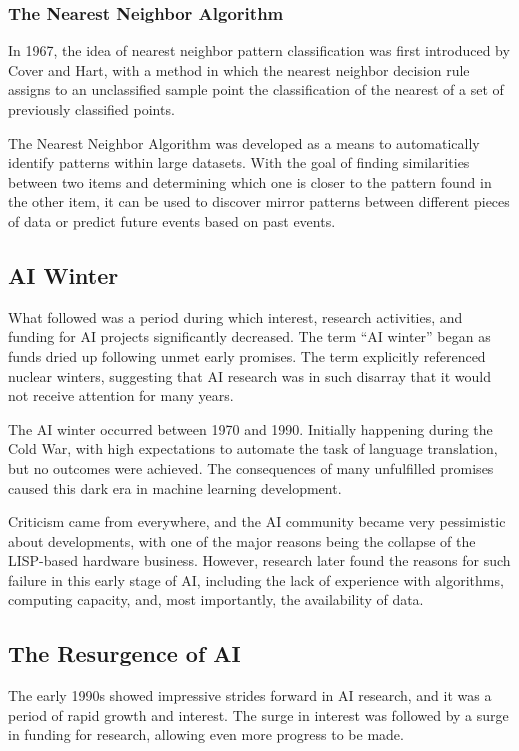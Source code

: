 \documentclass{article}
\begin{document}
\subsubsection{The Nearest Neighbor Algorithm}
In 1967, the idea of nearest neighbor pattern classification was first introduced by Cover and Hart, with a method in which the nearest neighbor decision rule assigns to an unclassified sample point the classification of the nearest of a set of previously classified points. 
\par
The Nearest Neighbor Algorithm was developed as a means to automatically identify patterns within large datasets. With the goal of finding similarities between two items and determining which one is closer to the pattern found in the other item, it can be used to discover mirror patterns between different pieces of data or predict future events based on past events. 
\par
\subsection{AI Winter}
What followed was a period during which interest, research activities, and funding for AI projects significantly decreased. The term ``AI winter'' began as funds dried up following unmet early promises. The term explicitly referenced nuclear winters, suggesting that AI research was in such disarray that it would not receive attention for many years. 
\par
The AI winter occurred between 1970 and 1990. Initially happening during the Cold War, with high expectations to automate the task of language translation, but no outcomes were achieved. The consequences of many unfulfilled promises caused this dark era in machine learning development. 
\par
Criticism came from everywhere, and the AI community became very pessimistic about developments, with one of the major reasons being the collapse of the LISP-based hardware business. However, research later found the reasons for such failure in this early stage of AI, including the lack of experience with algorithms, computing capacity, and, most importantly, the availability of data. 
\par
\subsection{The Resurgence of AI}
The early 1990s showed impressive strides forward in AI research, and it was a period of rapid growth and interest. The surge in interest was followed by a surge in funding for research, allowing even more progress to be made.
\par
\end{document}
